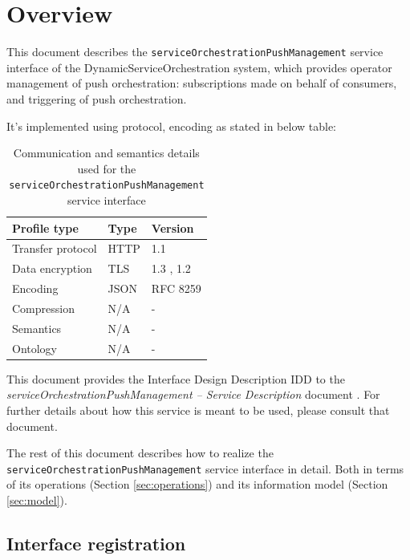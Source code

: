 \documentclass[a4paper]{arrowhead}
\begin{document}
\section{Overview}
\label{sec:overview}

This document describes the \texttt{service\allowbreak{}Orchestration\allowbreak{}Push\allowbreak{}Management} service interface of the DynamicServiceOrchestration system, which provides operator management of push orchestration: subscriptions made on behalf of consumers, and triggering of push orchestration.

It's implemented using protocol, encoding as stated in below table:
\begin{table}[ht!]
  \centering
  \begin{tabular}{|l|l|l|}
    \hline
    \rowcolor{gray!33} Profile type & Type & Version \\ \hline
    Transfer protocol & HTTP & 1.1 \cite{rfc9112} \\ \hline
    Data encryption & TLS & 1.3 \cite{rfc8446}, 1.2 \cite{rfc5246} \\ \hline
    Encoding & JSON & RFC 8259 \cite{rfc8259} \\ \hline
    Compression & N/A & - \\ \hline
    Semantics & N/A & - \\ \hline
    Ontology & N/A & - \\ \hline
  \end{tabular}
  \caption{Communication and semantics details used for the \texttt{service\allowbreak{}Orchestration\allowbreak{}Push\allowbreak{}Management} service interface}
  \label{tab:comunication_semantics_profile}
\end{table}

This document provides the Interface Design Description IDD to the \textit{serviceOrchestrationPushManagement -- Service Description} document \cite{dso-serviceOrchestrationPushManagement-sd}.
For further details about how this service is meant to be used, please consult that document.

The rest of this document describes how to realize the \texttt{service\allowbreak{}Orchestration\allowbreak{}Push\allowbreak{}Management} service
interface in detail. Both in terms of its operations (Section \ref{sec:operations}) and its information model (Section \ref{sec:model}).

\subsection{Interface registration}
\end{document}
